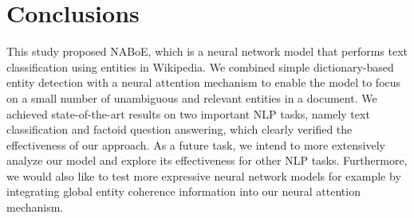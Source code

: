 \documentclass[11pt,a4paper]{article}
\begin{document}
    \section{Conclusions}
    This study proposed NABoE, which is a neural network model that performs text classification using entities in Wikipedia.
    We combined simple dictionary-based entity detection with a neural attention mechanism to enable the model to focus on a small number of unambiguous and relevant entities in a document.
    We achieved state-of-the-art results on two important NLP tasks, namely text classification and factoid question answering, which clearly verified the effectiveness of our approach.
    As a future task, we intend to more extensively analyze our model and explore its effectiveness for other NLP tasks.
    Furthermore, we would also like to test more expressive neural network models for example by integrating global entity coherence information into our neural attention mechanism.

    
    
\end{document}
